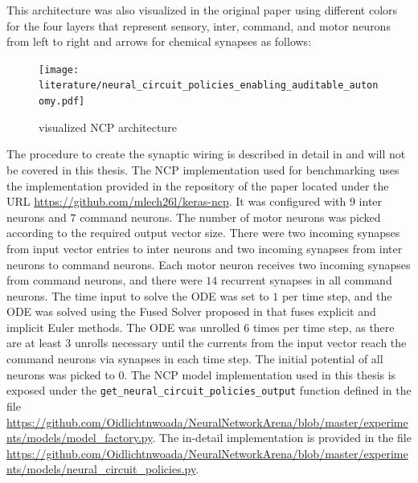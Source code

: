 \documentclass[draft,final]{vutinfth} %
\begin{document}
    This architecture was also visualized in the original paper using different colors for the four layers that represent sensory, inter, command, and motor neurons from left to right and arrows for chemical synapses as follows:
    \begin{figure}[H]
        \centering{}
        \texttt{[image: literature/neural\_circuit\_policies\_enabling\_auditable\_autonomy.pdf]}
        \caption{visualized NCP architecture \cite[p. 3]{NCP}}
        \label{fig:ncp_vis}
    \end{figure}
    The procedure to create the synaptic wiring is described in detail in \cite[p. 3]{NCP} and will not be covered in this thesis.
    The NCP implementation used for benchmarking uses the implementation provided in the repository of the paper \cite{NCP} located under the URL \url{https://github.com/mlech26l/keras-ncp}.
    It was configured with $9$ inter neurons and $7$ command neurons. The number of motor neurons was picked according to the required output vector size.
    There were two incoming synapses from input vector entries to inter neurons and two incoming synapses from inter neurons to command neurons.
    Each motor neuron receives two incoming synapses from command neurons, and there were $14$ recurrent synapses in all command neurons.
    The time input to solve the ODE was set to $1$ per time step, and the ODE was solved using the Fused Solver proposed in \cite{LTCNetworks} that fuses explicit and implicit Euler methods.
    The ODE was unrolled $6$ times per time step, as there are at least $3$ unrolls necessary until the currents from the input vector reach the command neurons via synapses in each time step.
    The initial potential of all neurons was picked to $0$.
    The NCP model implementation used in this thesis is exposed under the \texttt{get\_neural\_circuit\_policies\_output} function defined in the file \url{https://github.com/Oidlichtnwoada/NeuralNetworkArena/blob/master/experiments/models/model_factory.py}.
    The in-detail implementation is provided in the file \url{https://github.com/Oidlichtnwoada/NeuralNetworkArena/blob/master/experiments/models/neural_circuit_policies.py}.
\end{document}
